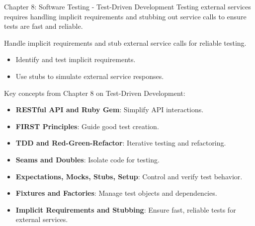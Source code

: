 \begin{notes}{Chapter 8: Software Testing - Test-Driven Development}
    Testing external services requires handling implicit requirements and stubbing out service calls to ensure tests are fast and reliable.
    
    \begin{highlight}
    
        Handle implicit requirements and stub external service calls for reliable testing.
        
        \begin{itemize}
            \item Identify and test implicit requirements.
            \item Use stubs to simulate external service responses.
        \end{itemize}
    
    \end{highlight}
    
    \begin{highlight}
    
        Key concepts from Chapter 8 on Test-Driven Development:
        
        \begin{itemize}
            \item \textbf{RESTful API and Ruby Gem}: Simplify API interactions.
            \item \textbf{FIRST Principles}: Guide good test creation.
            \item \textbf{TDD and Red-Green-Refactor}: Iterative testing and refactoring.
            \item \textbf{Seams and Doubles}: Isolate code for testing.
            \item \textbf{Expectations, Mocks, Stubs, Setup}: Control and verify test behavior.
            \item \textbf{Fixtures and Factories}: Manage test objects and dependencies.
            \item \textbf{Implicit Requirements and Stubbing}: Ensure fast, reliable tests for external services.
        \end{itemize}
        
    \end{highlight}
\end{notes}